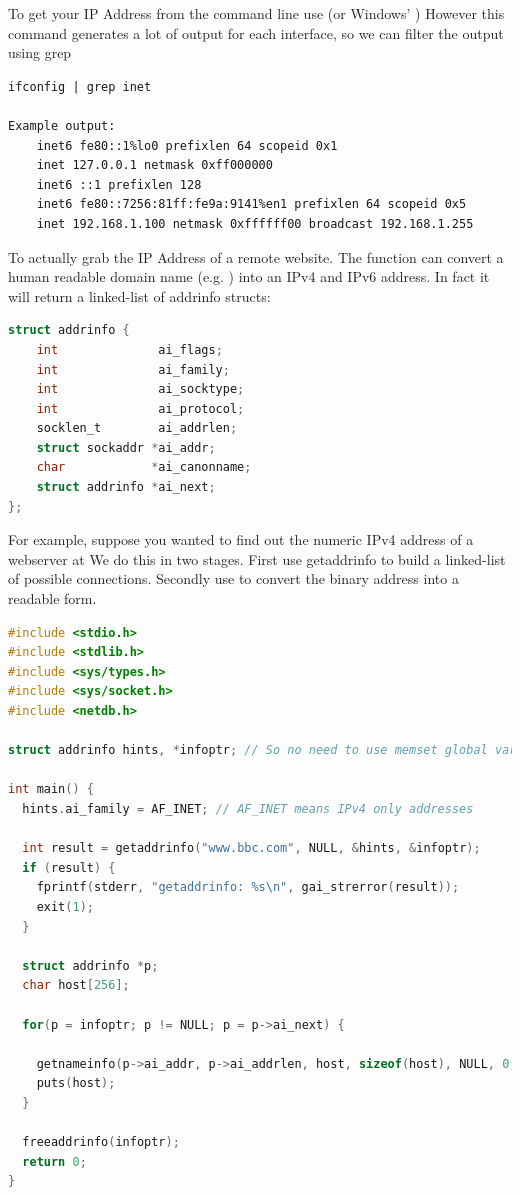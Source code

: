 To get your IP Address from the command line use  (or Windows' ) However this command generates a lot of output for each interface, so we can filter the output using grep

\begin{lstlisting}
ifconfig | grep inet

Example output:
    inet6 fe80::1%lo0 prefixlen 64 scopeid 0x1
    inet 127.0.0.1 netmask 0xff000000
    inet6 ::1 prefixlen 128
    inet6 fe80::7256:81ff:fe9a:9141%en1 prefixlen 64 scopeid 0x5
    inet 192.168.1.100 netmask 0xffffff00 broadcast 192.168.1.255
\end{lstlisting}

To actually grab the IP Address of a remote website. The function  can convert a human readable domain name (e.g.
) into an IPv4 and IPv6 address.
In fact it will return a linked-list of addrinfo structs:

\begin{lstlisting}[language=C]
struct addrinfo {
    int              ai_flags;
    int              ai_family;
    int              ai_socktype;
    int              ai_protocol;
    socklen_t        ai_addrlen;
    struct sockaddr *ai_addr;
    char            *ai_canonname;
    struct addrinfo *ai_next;
};
\end{lstlisting}

For example, suppose you wanted to find out the numeric IPv4 address of a webserver at 
We do this in two stages.
First use getaddrinfo to build a linked-list of possible connections.
Secondly use  to convert the binary address into a readable form.

\begin{lstlisting}[language=C]
#include <stdio.h>
#include <stdlib.h>
#include <sys/types.h>
#include <sys/socket.h>
#include <netdb.h>

struct addrinfo hints, *infoptr; // So no need to use memset global variables

int main() {
  hints.ai_family = AF_INET; // AF_INET means IPv4 only addresses

  int result = getaddrinfo("www.bbc.com", NULL, &hints, &infoptr);
  if (result) {
    fprintf(stderr, "getaddrinfo: %s\n", gai_strerror(result));
    exit(1);
  }

  struct addrinfo *p;
  char host[256];

  for(p = infoptr; p != NULL; p = p->ai_next) {

    getnameinfo(p->ai_addr, p->ai_addrlen, host, sizeof(host), NULL, 0, NI_NUMERICHOST);
    puts(host);
  }

  freeaddrinfo(infoptr);
  return 0;
}
\end{lstlisting}

